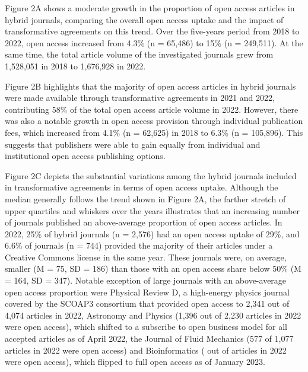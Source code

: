 \documentclass[a4paper,man,floatsintext,longtable,noextraspace,12pt]{apa6}
\begin{document}
Figure 2A shows a moderate growth in the proportion of open access
articles in hybrid journals, comparing the overall open access uptake
and the impact of transformative agreements on this trend. Over the
five-years period from 2018 to 2022, open access increased from 4.3\% (n
= 65,486) to 15\% (n = 249,511). At the same time, the total article
volume of the investigated journals grew from 1,528,051 in 2018 to
1,676,928 in 2022.

Figure 2B highlights that the majority of open access articles in hybrid
journals were made available through transformative agreements in 2021
and 2022, contributing 58\% of the total open access article volume in
2022. However, there was also a notable growth in open access provision
through individual publication fees, which increased from 4.1\% (n =
62,625) in 2018 to 6.3\% (n = 105,896). This suggests that publishers
were able to gain equally from individual and institutional open access
publishing options.

Figure 2C depicts the substantial variations among the hybrid journals
included in transformative agreements in terms of open access uptake.
Although the median generally follows the trend shown in Figure 2A, the
farther stretch of upper quartiles and whiskers over the years
illustrates that an increasing number of journals published an
above-average proportion of open access articles. In 2022, 25\% of
hybrid journals (n = 2,576) had an open access uptake of 29\%, and 6.6\%
of journals (n = 744) provided the majority of their articles under a
Creative Commons license in the same year. These journals were, on
average, smaller (M = 75, SD = 186) than those with an open access share
below 50\% (M = 164, SD = 347). Notable exception of large journals with
an above-average open access proportion were Physical Review D, a
high-energy physics journal covered by the SCOAP3 consortium that
provided open access to 2,341 out of 4,074 articles in 2022, Astronomy
and Physics (1,396 out of 2,230 articles in 2022 were open access),
which shifted to a subscribe to open business model for all accepted
articles as of April 2022, the Journal of Fluid Mechanics (577 of 1,077
articles in 2022 were open access) and Bioinformatics ( out of articles
in 2022 were open access), which flipped to full open access as of
January 2023.
\end{document}
